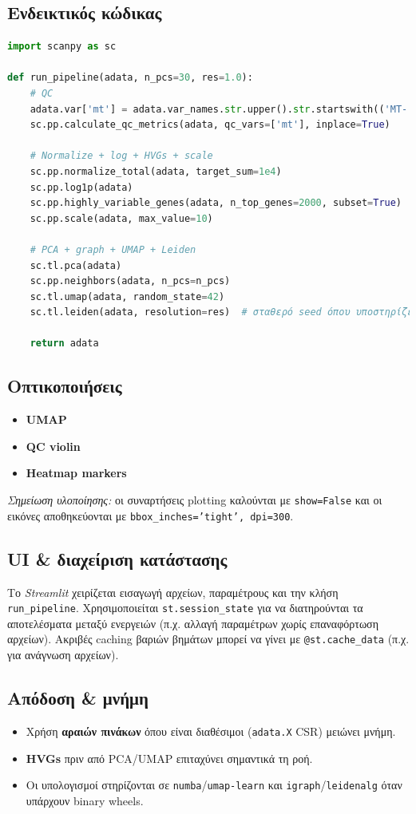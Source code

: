 \documentclass[12pt,a4paper]{article}
\begin{document}
\subsection{Ενδεικτικός κώδικας}
\begin{lstlisting}[language=Python]
import scanpy as sc

def run_pipeline(adata, n_pcs=30, res=1.0):
    # QC
    adata.var['mt'] = adata.var_names.str.upper().str.startswith(('MT-','MT.'))
    sc.pp.calculate_qc_metrics(adata, qc_vars=['mt'], inplace=True)

    # Normalize + log + HVGs + scale
    sc.pp.normalize_total(adata, target_sum=1e4)
    sc.pp.log1p(adata)
    sc.pp.highly_variable_genes(adata, n_top_genes=2000, subset=True)
    sc.pp.scale(adata, max_value=10)

    # PCA + graph + UMAP + Leiden
    sc.tl.pca(adata)
    sc.pp.neighbors(adata, n_pcs=n_pcs)
    sc.tl.umap(adata, random_state=42)
    sc.tl.leiden(adata, resolution=res)  # σταθερό seed όπου υποστηρίζεται

    return adata
\end{lstlisting}

\subsection{Οπτικοποιήσεις}
\begin{itemize}
  \item \textbf{UMAP}
  \item \textbf{QC violin}
  \item \textbf{Heatmap markers}
\end{itemize}
\noindent \textit{Σημείωση υλοποίησης:} οι συναρτήσεις plotting καλούνται με \texttt{show=False} και οι εικόνες αποθηκεύονται με \texttt{bbox\_inches='tight', dpi=300}.

\subsection{UI \& διαχείριση κατάστασης}
Το \textit{Streamlit} χειρίζεται εισαγωγή αρχείων, παραμέτρους και την κλήση \texttt{run\_pipeline}. Χρησιμοποιείται \texttt{st.session\_state} για να διατηρούνται τα αποτελέσματα μεταξύ ενεργειών (π.χ. αλλαγή παραμέτρων χωρίς επαναφόρτωση αρχείων). Ακριβές caching βαριών βημάτων μπορεί να γίνει με \texttt{@st.cache\_data} (π.χ. για ανάγνωση αρχείων).

\subsection{Απόδοση \& μνήμη}
\begin{itemize}
  \item Χρήση \textbf{αραιών πινάκων} όπου είναι διαθέσιμοι (\texttt{adata.X} CSR) μειώνει μνήμη.
  \item \textbf{HVGs} πριν από PCA/UMAP επιταχύνει σημαντικά τη ροή.
  \item Οι υπολογισμοί στηρίζονται σε \texttt{numba}/\texttt{umap-learn} και \texttt{igraph}/\texttt{leidenalg} όταν υπάρχουν binary wheels.
\end{itemize}
\end{document}
